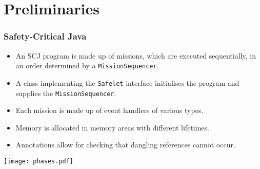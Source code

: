 \documentclass{beamer}
\begin{document}
\section{Preliminaries}

\begin{frame}
  \frametitle{Safety-Critical Java}
  \begin{itemize}
  \item An SCJ program is made up of missions, which are executed sequentially, in an order determined by a \texttt{MissionSequencer}.
  \item A class implementing the \texttt{Safelet} interface initialises the program and supplies the \texttt{MissionSequencer}.
  \item Each mission is made up of event handlers of various types.
  \item Memory is allocated in memory areas with different lifetimes.
  \item Annotations allow for checking that dangling references cannot occur.
  \end{itemize}
  \texttt{[image: phases.pdf]}
\end{frame}

\end{document}
